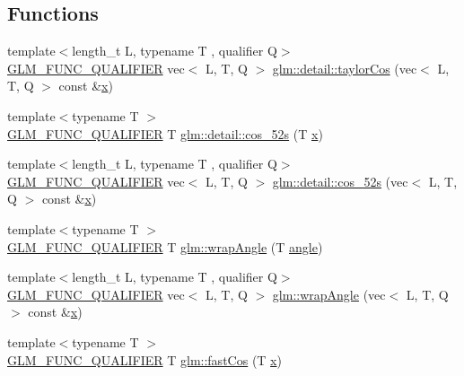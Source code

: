 \subsection*{Functions}
\begin{DoxyCompactItemize}
\item 
{\footnotesize template$<$length\+\_\+t L, typename T , qualifier Q$>$ }\\\hyperlink{setup_8hpp_a33fdea6f91c5f834105f7415e2a64407}{G\+L\+M\+\_\+\+F\+U\+N\+C\+\_\+\+Q\+U\+A\+L\+I\+F\+I\+ER} vec$<$ L, T, Q $>$ \hyperlink{namespaceglm_1_1detail_a2cb8ceabe04661b078d956cf0a5e96c7}{glm\+::detail\+::taylor\+Cos} (vec$<$ L, T, Q $>$ const \&\hyperlink{_s_d_l__opengl_8h_ad0e63d0edcdbd3d79554076bf309fd47}{x})
\item 
{\footnotesize template$<$typename T $>$ }\\\hyperlink{setup_8hpp_a33fdea6f91c5f834105f7415e2a64407}{G\+L\+M\+\_\+\+F\+U\+N\+C\+\_\+\+Q\+U\+A\+L\+I\+F\+I\+ER} T \hyperlink{namespaceglm_1_1detail_a09055f8d723109dc95c8cc2309e20acc}{glm\+::detail\+::cos\+\_\+52s} (T \hyperlink{_s_d_l__opengl_8h_ad0e63d0edcdbd3d79554076bf309fd47}{x})
\item 
{\footnotesize template$<$length\+\_\+t L, typename T , qualifier Q$>$ }\\\hyperlink{setup_8hpp_a33fdea6f91c5f834105f7415e2a64407}{G\+L\+M\+\_\+\+F\+U\+N\+C\+\_\+\+Q\+U\+A\+L\+I\+F\+I\+ER} vec$<$ L, T, Q $>$ \hyperlink{namespaceglm_1_1detail_af69b36906b6e079461bf24ba03c89e73}{glm\+::detail\+::cos\+\_\+52s} (vec$<$ L, T, Q $>$ const \&\hyperlink{_s_d_l__opengl_8h_ad0e63d0edcdbd3d79554076bf309fd47}{x})
\item 
{\footnotesize template$<$typename T $>$ }\\\hyperlink{setup_8hpp_a33fdea6f91c5f834105f7415e2a64407}{G\+L\+M\+\_\+\+F\+U\+N\+C\+\_\+\+Q\+U\+A\+L\+I\+F\+I\+ER} T \hyperlink{group__gtx__fast__trigonometry_ga069527c6dbd64f53435b8ebc4878b473}{glm\+::wrap\+Angle} (T \hyperlink{_s_d_l__opengl__glext_8h_a9e06c1f76a20fed54ca742cd25cb02c4}{angle})
\item 
{\footnotesize template$<$length\+\_\+t L, typename T , qualifier Q$>$ }\\\hyperlink{setup_8hpp_a33fdea6f91c5f834105f7415e2a64407}{G\+L\+M\+\_\+\+F\+U\+N\+C\+\_\+\+Q\+U\+A\+L\+I\+F\+I\+ER} vec$<$ L, T, Q $>$ \hyperlink{namespaceglm_a7500f6763ca1feb7c2ab574bede4999d}{glm\+::wrap\+Angle} (vec$<$ L, T, Q $>$ const \&\hyperlink{_s_d_l__opengl_8h_ad0e63d0edcdbd3d79554076bf309fd47}{x})
\item 
{\footnotesize template$<$typename T $>$ }\\\hyperlink{setup_8hpp_a33fdea6f91c5f834105f7415e2a64407}{G\+L\+M\+\_\+\+F\+U\+N\+C\+\_\+\+Q\+U\+A\+L\+I\+F\+I\+ER} T \hyperlink{group__gtx__fast__trigonometry_gab34c8b45c23c0165a64dcecfcc3b302a}{glm\+::fast\+Cos} (T \hyperlink{_s_d_l__opengl_8h_ad0e63d0edcdbd3d79554076bf309fd47}{x})

\end{DoxyCompactItemize}
